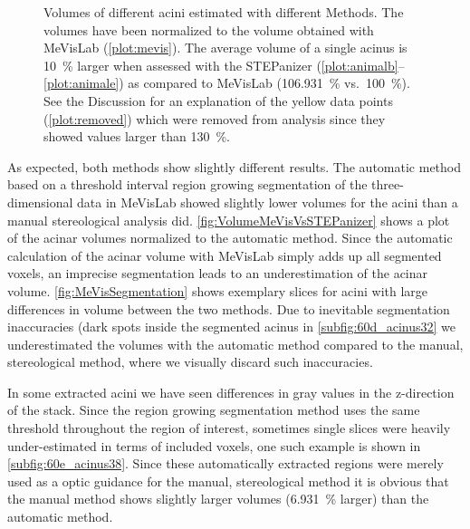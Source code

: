 \documentclass[%
	draft,
	paper=a4,%
	abstract=true,%
	]{scrartcl}
\begin{document}
\begin{figure}
	\caption{Volumes of different acini estimated with different Methods. The volumes have been normalized to the volume obtained with MeVisLab (\ref{plot:mevis}). The average volume of a single acinus is \SI{10}{\percent} larger when assessed with the STEPanizer (\ref{plot:animalb}--\ref{plot:animale}) as compared to MeVisLab (\SI{106.931}{\percent} vs.\ \SI{100}{\percent}). %
		See the Discussion for an explanation of the yellow data points (\ref{plot:removed}) which were removed from analysis since they showed values larger than \SI{130}{\percent}.}%
	\label{fig:VolumeMeVisVsSTEPanizer}%
\end{figure}

As expected, both methods show slightly different results. The automatic method based on a threshold interval region growing segmentation of the three-dimensional data in MeVisLab showed slightly lower volumes for the acini than a manual stereological analysis did. \autoref{fig:VolumeMeVisVsSTEPanizer} shows a plot of the acinar volumes normalized to the automatic method. Since the automatic calculation of the acinar volume with MeVisLab simply adds up all segmented voxels, an imprecise segmentation leads to an underestimation of the acinar volume. \autoref{fig:MeVisSegmentation} shows exemplary slices for acini with large differences in volume between the two methods. Due to inevitable segmentation inaccuracies (dark spots inside the segmented acinus in \autoref{subfig:60d_acinus32} we underestimated the volumes with the automatic method compared to the manual, stereological method, where we visually discard such inaccuracies.

In some extracted acini we have seen differences in gray values in the z-direction of the stack. Since the region growing segmentation method uses the same threshold throughout the region of interest, sometimes single slices were heavily under-estimated in terms of included voxels, one such example is shown in \autoref{subfig:60e_acinus38}. Since these automatically extracted regions were merely used as a optic guidance for the manual, stereological method it is obvious that the manual method shows slightly larger volumes (\SI{6.931}{\percent} larger) than the automatic method.
\end{document}
